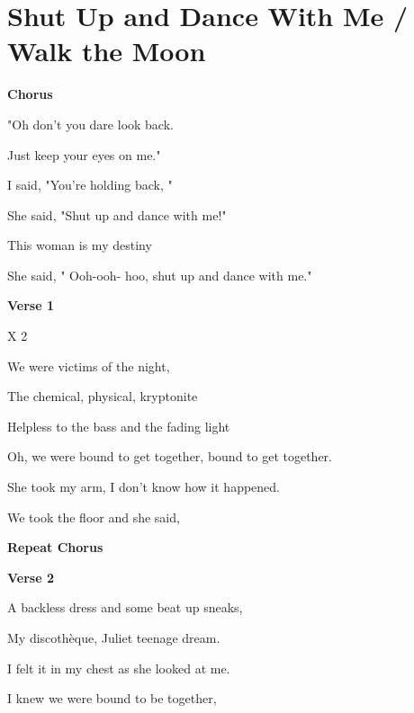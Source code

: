 \section{Shut Up and Dance With Me / Walk the Moon}\label{sec:shutupanddancewithme}

\Gmajor
\Cmajor
\Fmajor
\Aminor

\textbf{Chorus}

 "Oh don't you  dare look  back.

Just keep your  eyes on  me."

I said, "You're  holding  back, "

She said, "Shut  up and  dance with  me!"

This  woman is my  destiny 

She said, " Ooh-ooh- hoo, shut  up and  dance with  me."

\textbf{Verse 1}

     X 2

We were  victims  of the  night,

The  chemical,  physical,  kryptonite 

 Helpless to the  bass and the  fading  light

 Oh, we were  bound to get together,  bound to get together.


She  took my  arm, I don't know  how it  happened.

We  took the  floor and she  said,

\textbf{Repeat Chorus}

\textbf{Verse 2}

A backless  dress and some  beat up  sneaks,

My  discothèque,  Juliet  teenage  dream.

I  felt it in my  chest as she  looked at  me. 

I knew we were  bound to be together,

